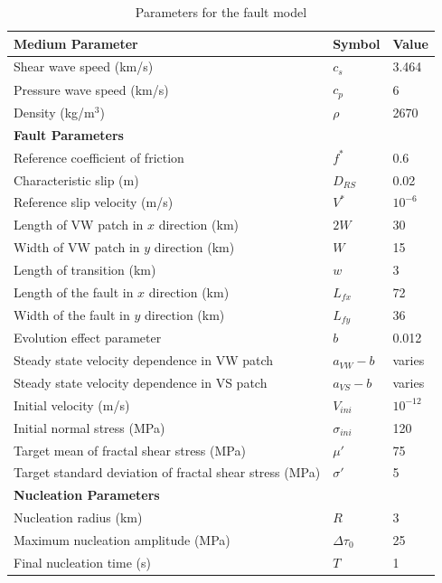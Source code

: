 \documentclass[draft]{agujournal2019}
\begin{document}
\begin{table}[ht!]
\caption{\label{table:2D_parameters}Parameters for the fault model}
\centering
\begin{tabular}{@{}lll@{}}
\toprule
\textbf{Medium Parameter}       & \textbf{Symbol} & \textbf{Value} \\ \midrule
Shear wave speed (km/s)         & $c_s$           & 3.464            \\
Pressure wave speed (km/s)      & $c_p$           & 6            \\
Density (kg/m\(^3\))            & $\rho$          & 2670         \\\midrule
\textbf{Fault Parameters}       &                 &                \\ \midrule
Reference coefficient of friction & $f^*$          & 0.6            \\
Characteristic slip (m)         & $D_{RS}$             & 0.02             \\
Reference slip velocity (m/s)   & $V^*$           & $10^{-6}$      \\
Length of VW patch in $x$ direction (km)          & $2W$        & 30             \\
Width of VW patch in $y$ direction (km)          & $W$        & 15             \\
Length of transition (km)        & $w$     & 3             \\
Length of the fault in $x$ direction (km)         & $L_{fx}$           & 72             \\
Width of the fault in $y$ direction (km)         & $L_{fy}$           & 36             \\
Evolution effect parameter      & $b$             & 0.012          \\
Steady state velocity dependence in VW patch & $a_{VW} - b$ & varies \\
Steady state velocity dependence in VS patch & $a_{VS} - b$ & varies   \\ 
Initial velocity (m/s)          & $V_{ini}$     & $10^{-12}$ \\
Initial normal stress (MPa)     & $\sigma_{ini}$ & 120 \\
Target mean of fractal shear stress (MPa) & $\mu'$ & 75 \\
Target standard deviation of fractal shear stress (MPa) & $\sigma'$ & 5 \\ \midrule
\textbf{Nucleation Parameters}  &                 &                \\ \midrule
Nucleation radius (km)             & $R$      & 3           \\
Maximum nucleation amplitude (MPa) & $\Delta\tau_{0}$        & 25            \\
Final nucleation time (s) & $T$        & 1            \\
\bottomrule
\end{tabular}
\end{table}
\end{document}
